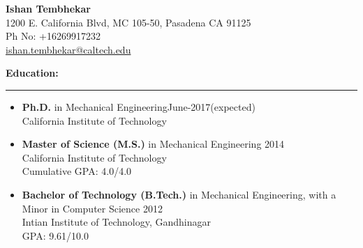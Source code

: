 \documentclass[10pt,fleqn]{article}
\begin{document}
\thispagestyle{empty}
\begin{center}
\LARGE \textbf{Ishan Tembhekar} \small \\[0.16cm]
1200 E. California Blvd, MC 105-50, Pasadena CA 91125 \\
Ph No: +16269917232 \\
\href{mailto:ishan.tembhekar@caltech.edu}{ishan.tembhekar@caltech.edu} \hfill
\end{center}
\textbf{Education:}
\vspace{-25pt}
\begin{center}
\rule{\textwidth}{.4pt}
\end{center}
\vspace{-15pt}
\begin{itemize}
\setlength{\itemsep}{5pt}
\setlength{\parskip}{0pt}
\setlength{\itemindent}{-5mm}
\item[] \textbf{Ph.D.} in Mechanical Engineering\hfill  June-2017(expected)\\
		California Institute of Technology
\item[] \textbf{Master of Science (M.S.)} in Mechanical Engineering \hfill 2014\\
		California Institute of Technology\\
		Cumulative GPA: 4.0/4.0 
\item[] \textbf{Bachelor of Technology (B.Tech.)} in Mechanical Engineering, with a Minor in Computer Science \hfill 2012\\
		Intian Institute of Technology, Gandhinagar\\
		GPA: 9.61/10.0
\end{itemize}
\end{document}
